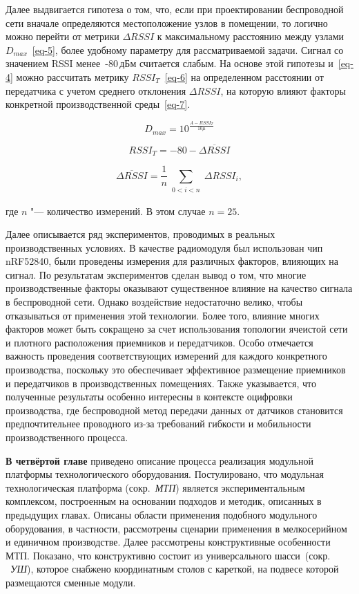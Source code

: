 Далее выдвигается гипотеза о том, что, если при проектировании беспроводной сети вначале определяются местоположение узлов в помещении, то логично можно перейти от метрики $\Delta RSSI$ к максимальному расстоянию между узлами~$D_{max}$~\cref{eq-5}, более удобному параметру для рассматриваемой задачи. Сигнал со значением RSSI менее~-80\,дБм считается слабым. На основе этой гипотезы и~\cref{eq-4} можно рассчитать метрику $RSSI_T$~\cref{eq-6} на определенном расстоянии от передатчика с учетом среднего отклонения $\Delta RSSI$, на которую влияют факторы конкретной производственной среды~\cref{eq-7}.

\begin{equation}
D_{max} = 10^\frac{A-RSSI_T}{10 \mu}
\label{eq-5}
\end{equation}

\begin{equation}
RSSI_T = -80-\overline{{\mathit \Delta} RSSI}
\label{eq-6}
\end{equation}

\begin{equation}
\overline{{\mathit \Delta} RSSI} = \frac1n \sum_{\substack{0 < i < n}}{\mathit\Delta} RSSI_i,
\label{eq-7}
\end{equation}

\noindent где $n$ "--- количество измерений. В этом случае $n = 25$.  

Далее описывается ряд экспериментов, проводимых в реальных производственных условиях. В качестве радиомодуля был использован чип nRF52840, были проведены измерения для различных факторов, влияющих на сигнал. По результатам экспериментов сделан вывод о том, что многие производственные факторы оказывают существенное влияние на качество сигнала в беспроводной сети. Однако воздействие недостаточно велико, чтобы отказываться от применения этой технологии. Более того, влияние многих факторов может быть сокращено за счет использования топологии ячеистой сети и плотного расположения приемников и передатчиков. Особо отмечается важность проведения соответствующих измерений для каждого конкретного производства, поскольку это обеспечивает эффективное размещение приемников и передатчиков в производственных помещениях. Также указывается, что полученные результаты особенно интересны в контексте оцифровки производства, где беспроводной метод передачи данных от датчиков становится предпочтительнее проводного из-за требований гибкости и мобильности производственного процесса. 


\textbf{В четвёртой главе} приведено описание процесса реализация модульной платформы технологического оборудования. Постулировано, что модульная технологическая платформа (сокр.~\textit{МТП}) является экспериментальным комплексом, построенным на основании подходов и методик, описанных в предыдущих главах. Описаны области применения подобного модульного оборудования, в частности, рассмотрены сценарии применения в мелкосерийном и единичном производстве. Далее рассмотрены конструктивные особенности МТП. Показано, что конструктивно состоит из универсального шасси~(сокр. ~\textit{УШ}), которое снабжено координатным столов с кареткой, на подвесе которой размещаются сменные модули. 

